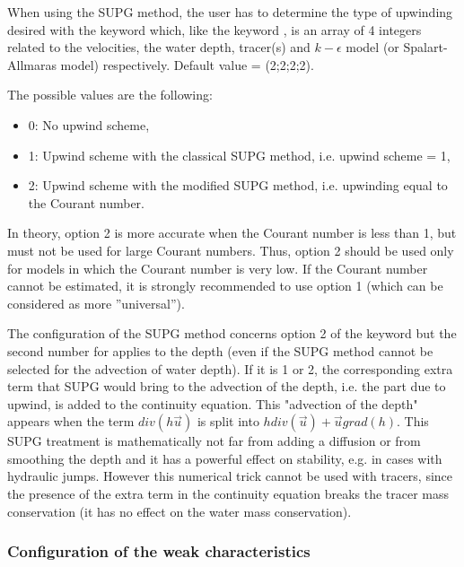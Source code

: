 When using the SUPG method, the user has to determine the type of upwinding
desired with the keyword  which, like the keyword
, is an array of 4 integers
related to the velocities, the water depth, tracer(s) and $k-\epsilon$ model
(or Spalart-Allmaras model) respectively.
Default value = (2;2;2;2).

The possible values are the following:

\begin{itemize}
\item 0: No upwind scheme,

\item 1: Upwind scheme with the classical SUPG method,
i.e. upwind scheme = 1,

\item 2: Upwind scheme with the modified SUPG method,
i.e. upwinding equal to the Courant number.
\end{itemize}

In theory, option 2 is more accurate when the Courant number is less than 1,
but must not be used for large Courant numbers.
Thus, option 2 should be used only for models in which the Courant number is
very low.
If the Courant number cannot be estimated, it is strongly recommended
to use option 1 (which can be considered as more ''universal'').

The configuration of the SUPG method concerns option 2 of the keyword
 but the second number for 
applies to the depth (even if the SUPG method cannot be selected for the
advection of water depth).
If it is 1 or 2, the corresponding extra term that SUPG would bring
to the advection of the depth,
i.e. the part due to upwind, is added to the continuity equation.
This "advection of the depth" appears when the term $div(h\vec{u})$ is split
into $h div(\vec{u}) + \vec{u}grad(h)$.
This SUPG treatment is mathematically not far from adding a diffusion
or from smoothing the depth and it has a powerful effect on stability,
e.g. in cases with hydraulic jumps.
However this numerical trick cannot be used with tracers,
since the presence of the extra term in the continuity equation breaks
the tracer mass conservation (it has no effect on the water mass conservation).

\subsubsection{Configuration of the weak characteristics}

